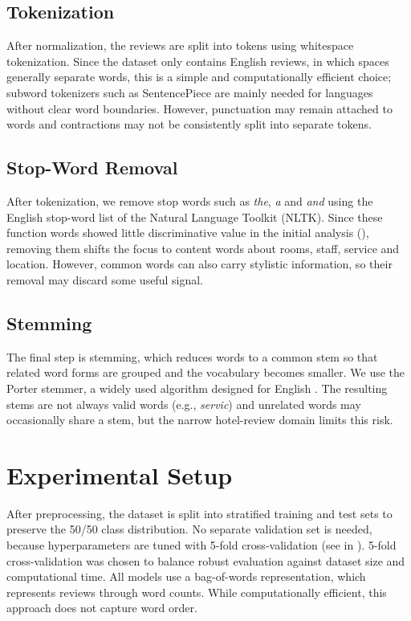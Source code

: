 \documentclass[pmlr]{jmlr}%
\begin{document}
\subsection{Tokenization}
\label{sec:tokenization}
After normalization, the reviews are split into tokens using whitespace tokenization.
Since the dataset only contains English reviews, in which spaces generally separate words, this is a simple and computationally efficient choice; subword tokenizers such as SentencePiece \citep{Kudo2018} are mainly needed for languages without clear word boundaries.
However, punctuation may remain attached to words and contractions may not be consistently split into separate tokens.

\subsection{Stop-Word Removal}
\label{sec:stop-word-removal}
After tokenization, we remove stop words such as \textit{the}, \textit{a} and \textit{and} using the English stop-word list of the Natural Language Toolkit (NLTK).
Since these function words showed little discriminative value in the initial analysis (), removing them shifts the focus to content words about rooms, staff, service and location.
However, common words can also carry stylistic information, so their removal may discard some useful signal.

\subsection{Stemming}
\label{sec:stemming}
The final step is stemming, which reduces words to a common stem so that related word forms are grouped and the vocabulary becomes smaller.
We use the Porter stemmer, a widely used algorithm designed for English \citep{Willett2006}.
The resulting stems are not always valid words (e.g., \emph{servic}) and unrelated words may occasionally share a stem, but the narrow hotel-review domain limits this risk.

\section{Experimental Setup}
\label{sec:setup}

After preprocessing, the dataset is split into stratified training and test sets to preserve the 50/50 class distribution. 
No separate validation set is needed, because hyperparameters are tuned with 5-fold cross-validation (see  in ).
5-fold cross-validation was chosen to balance robust evaluation against dataset size and computational time.
All models use a bag-of-words representation, which represents reviews through word counts. While computationally efficient, this approach does not capture word order.
\end{document}
